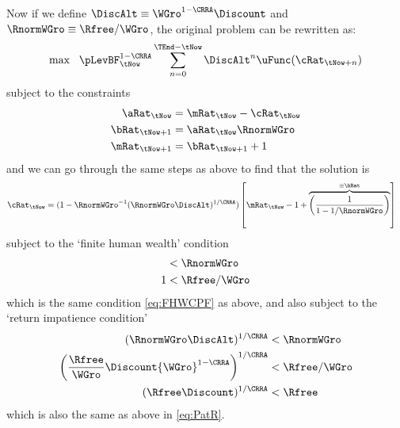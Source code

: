 Now if we define $\DiscAlt \equiv {\WGro}^{1-\CRRA}\Discount$ and $\RnormWGro \equiv \Rfree/{\WGro}$,
the original problem can be rewritten as:
\begin{equation}
\max~~\pLevBF_{\tNow}^{1-\CRRA}\sum_{n=0}^{\TEnd-\tNow} \DiscAlt^{n} \uFunc(\cRat_{\tNow+n})             \label{eq:scaledmaxprob}
\end{equation}
subject to the constraints
\begin{equation}\begin{gathered}\begin{aligned}
   \aRat_{\tNow}   & =  \mRat_{\tNow}-\cRat_{\tNow}
\\ \bRat_{\tNow+1} & =  \aRat_{\tNow}\RnormWGro
\\ \mRat_{\tNow+1} & =  \bRat_{\tNow+1}+1
\end{aligned}\end{gathered}\end{equation}
and we can go through the same steps as above to find that the solution
is
\begin{equation}\begin{gathered}\begin{aligned}
        \cRat_{\tNow} & =  (1-\RnormWGro^{-1}(\RnormWGro\DiscAlt)^{1/\CRRA})\left[\mRat_{\tNow}-1+\overbrace{\left(\frac{1}{1-{1}/\RnormWGro}\right)}^{\equiv\hRat}\right] \label{eq:normC}
\end{aligned}\end{gathered}\end{equation}
subject to the `finite human wealth' condition
\begin{equation}\begin{gathered}\begin{aligned}
        {1} & <  \RnormWGro
\\  1 & <  \Rfree/\WGro
\end{aligned}\end{gathered}\end{equation}
which is the same condition \eqref{eq:FHWCPF} as above, and also subject to the `return impatience condition'
\begin{equation}\begin{gathered}\begin{aligned}
                (\RnormWGro\DiscAlt)^{1/\CRRA} & <  \RnormWGro
\\              \left(\frac{\Rfree}{{\WGro}}\Discount {\WGro}^{1-\CRRA}\right)^{1/\CRRA} & <  \Rfree/{\WGro}
\\              (\Rfree\Discount)^{1/\CRRA} & <  \Rfree
\end{aligned}\end{gathered}\end{equation}
which is also the same as above in \eqref{eq:PatR}.

